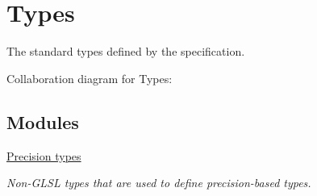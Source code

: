 \hypertarget{group__core__types}{\section{Types}
\label{group__core__types}
}


The standard types defined by the specification.  


Collaboration diagram for Types\-:
\subsection*{Modules}
\begin{DoxyCompactItemize}
\item 
\hyperlink{group__core__precision}{Precision types}
\begin{DoxyCompactList}\small\item\em Non-\/\-G\-L\-S\-L types that are used to define precision-\/based types. \end{DoxyCompactList}\end{DoxyCompactItemize}
